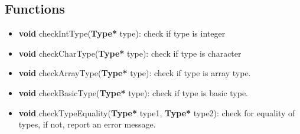 \documentclass[12pt, a4paper]{report}
\begin{document}
			\subsection{Functions}
				\begin{itemize}
					\item \textbf{void} checkIntType(\textbf{Type*} type): check if type is integer
					\item \textbf{void} checkCharType(\textbf{Type*} type): check if type is character	
					\item \textbf{void} checkArrayType(\textbf{Type*} type): check if type is array type.
					\item \textbf{void} checkBasicType(\textbf{Type*} type): check if type is basic type.
					\item \textbf{void} checkTypeEquality(\textbf{Type*} type1, \textbf{Type*} type2): check for equality of types, if not, report an error message.
				\end{itemize}

					
\end{document}
